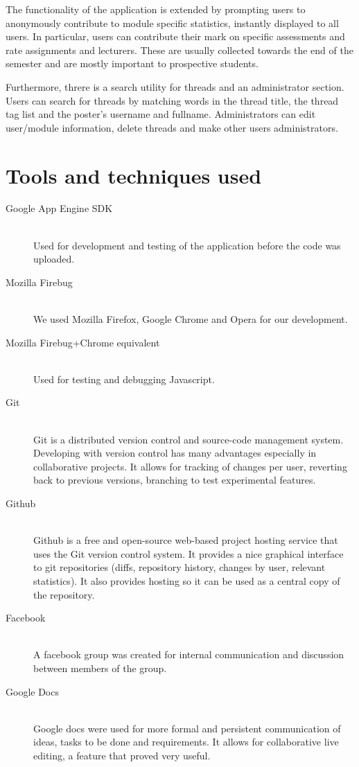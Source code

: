 \documentclass[12pt,a4paper,titlepage]{article}
\begin{document}
The functionality of the application is extended by prompting users to anonymously contribute to module specific statistics, instantly displayed to all users. In particular, users can contribute their mark on specific assessments and rate assignments and lecturers. These are usually collected towards the end of the semester and are mostly important to prospective students.

Furthermore, threre is a search utility for threads and an administrator section. Users can search for threads by matching words in the thread title, the thread tag list and the poster's username and fullname. Administrators can edit user/module information, delete threads and make other users administrators.

\newpage
\section{Tools and techniques used}
 \begin{description}
 \item[Google App Engine SDK]\hfill\\
  Used for development and testing of the application before the code was uploaded.
\item[Mozilla Firebug]\hfill\\
  	We used Mozilla Firefox, Google Chrome and Opera for our development.
\item[Mozilla Firebug+Chrome equivalent]\hfill\\
  Used for testing and debugging Javascript.
  \item[Git] \hfill \\
  Git is a distributed version control and source-code management system. Developing with version control has many advantages especially in collaborative projects. It allows for tracking of changes per user, reverting back to previous versions, branching to test experimental features. 
  \item[Github] \hfill \\
  Github is a free and open-source web-based project hosting service that uses the Git version control system.  It provides a nice graphical interface to git repositories (diffs, repository history, changes by user, relevant statistics). It also provides hosting so it can be used as a central copy of the repository.
\item[Facebook] \hfill \\
  A facebook group was created for internal communication and discussion between members of the group. 
\item[Google Docs] \hfill \\
  Google docs were used for more formal and persistent communication of ideas, tasks to be done and requirements. It allows for collaborative live editing, a feature that proved very useful.
\end{description}
\end{document}
